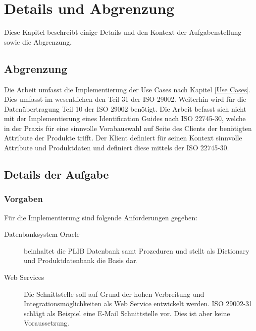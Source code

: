\section{Details und Abgrenzung}

Diese Kapitel beschreibt einige Details und den Kontext der Aufgabenstellung sowie die Abgrenzung.

\subsection{Abgrenzung}

Die Arbeit umfasst die Implementierung der Use Cases nach Kapitel \ref{Use Cases}. Dies umfasst im wesentlichen den Teil 31 der ISO 29002. Weiterhin wird für die Datenübertragung Teil 10 der ISO 29002 benötigt. Die Arbeit befasst sich nicht mit der Implementierung eines Identification Guides nach ISO 22745-30, welche in der Praxis für eine sinnvolle Vorabauswahl auf Seite des Clients der benötigten Attribute der Produkte trifft. Der Klient definiert für seinen Kontext sinnvolle Attribute und Produktdaten und definiert diese mittels der ISO 22745-30. 

\subsection{Details der Aufgabe}

\subsubsection{Vorgaben}

Für die Implementierung sind folgende Anforderungen gegeben:
\begin{description}
\item[Datenbanksystem Oracle] beinhaltet die PLIB Datenbank samt Prozeduren und stellt als Dictionary und Produktdatenbank die Basis dar.
\item[Web Services] Die Schnittstelle soll auf Grund der hohen Verbreitung und Integrationsmöglichkeiten als Web Service entwickelt werden. ISO 29002-31 schlägt als Beispiel eine E-Mail Schnittstelle vor. Dies ist aber keine Voraussetzung. 
\end{description}

